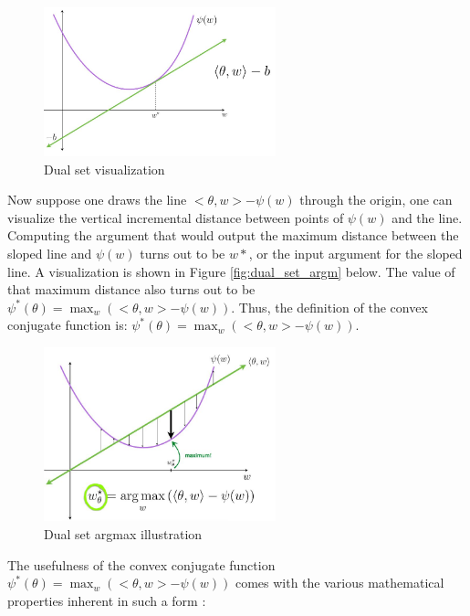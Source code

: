 \documentclass[11pt]{article}
\begin{document}
\begin{figure}[H]
    \centering
    \includegraphics[width=0.6\textwidth]{dual_set_graph.JPG}
    \caption{Dual set visualization}
    \label{fig:dual_set_graph}
\end{figure}

Now suppose one draws the line $<\theta, w> - \psi(w)$ through the origin, one can visualize the vertical incremental distance between points of $\psi(w)$ and the line. Computing the argument that would output the maximum distance between the sloped line and $\psi(w)$ turns out to be $w*$, or the input argument for the sloped line. A visualization is shown in Figure \ref{fig:dual_set_argm} below. The value of that maximum distance also turns out to be $\psi^*(\theta) = \max_w (<\theta, w> - \psi(w))$. Thus, the definition of the convex conjugate function is: $\psi^*(\theta) = \max_w (<\theta, w> - \psi(w))$. 

\begin{figure}[H]
    \centering
    \includegraphics[width=0.6\textwidth]{dual_set_argmax_w.JPG}
    \caption{Dual set argmax illustration}
    \label{fig:dual_set_argmax}
\end{figure}

The usefulness of the convex conjugate function $\psi^*(\theta) = \max_w (<\theta, w> - \psi(w))$ comes with the various mathematical properties inherent in such a form \cite{wiki:Convex_conjugate}: 
\end{document}
